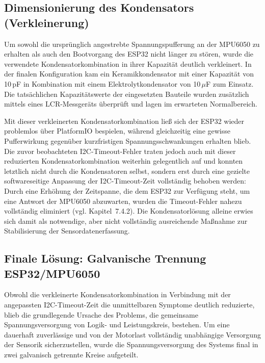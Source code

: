 \documentclass[12pt,ngerman,numbers=noenddot,abstracton,headsepline]{scrreprt}
\begin{document}
\subsection{Dimensionierung des Kondensators (Verkleinerung)}
\label{subsec:kondensator_verkleinerung}

Um sowohl die ursprünglich angestrebte Spannungspufferung an der MPU6050 zu erhalten als auch den Bootvorgang des ESP32 nicht länger zu stören, wurde die verwendete Kondensatorkombination in ihrer Kapazität deutlich verkleinert. In der finalen Konfiguration kam ein Keramikkondensator mit einer Kapazität von 10\,pF in Kombination mit einem Elektrolytkondensator von 10\,$\mu$F zum Einsatz. Die tatsächlichen Kapazitätswerte der eingesetzten Bauteile wurden zusätzlich mittels eines LCR-Messgeräts überprüft und lagen im erwarteten Normalbereich.

Mit dieser verkleinerten Kondensatorkombination ließ sich der ESP32 wieder problemlos über PlatformIO bespielen, während gleichzeitig eine gewisse Pufferwirkung gegenüber kurzfristigen Spannungsschwankungen erhalten blieb. Die zuvor beobachteten I2C-Timeout-Fehler traten jedoch auch mit dieser reduzierten Kondensatorkombination weiterhin gelegentlich auf und konnten letztlich nicht durch die Kondensatoren selbst, sondern erst durch eine gezielte softwareseitige Anpassung der I2C-Timeout-Zeit vollständig behoben werden: Durch eine Erhöhung der Zeitspanne, die dem ESP32 zur Verfügung steht, um eine Antwort der MPU6050 abzuwarten, wurden die Timeout-Fehler nahezu vollständig eliminiert (vgl. Kapitel~7.4.2). Die Kondensatorlösung alleine erwies sich damit als notwendige, aber nicht vollständig ausreichende Maßnahme zur Stabilisierung der Sensordatenerfassung.

\subsection{Finale Lösung: Galvanische Trennung ESP32/MPU6050}
\label{subsec:galvanische_trennung}

Obwohl die verkleinerte Kondensatorkombination in Verbindung mit der angepassten I2C-Timeout-Zeit die unmittelbaren Symptome deutlich reduzierte, blieb die grundlegende Ursache des Problems, die gemeinsame Spannungsversorgung von Logik- und Leistungskreis, bestehen. Um eine dauerhaft zuverlässige und von der Motorlast vollständig unabhängige Versorgung der Sensorik sicherzustellen, wurde die Spannungsversorgung des Systems final in zwei galvanisch getrennte Kreise aufgeteilt.
\end{document}
